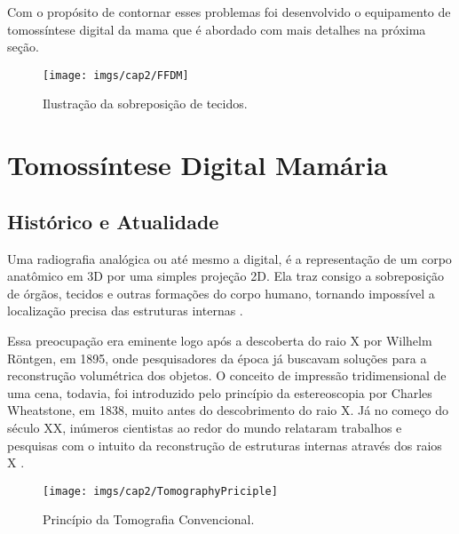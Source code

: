 Com o propósito de contornar esses problemas foi desenvolvido o equipamento de tomossíntese digital da mama que é abordado com mais detalhes na próxima seção. 

\begin{figure}[H]
	\caption{Ilustração da sobreposição de tecidos.}
	\begin{center}
		\texttt{[image: imgs/cap2/FFDM]}
	\end{center}
	\label{fig:imgCap2MamografiaSobreposicao}
\end{figure}    

\section{Tomossíntese Digital Mamária}     

\subsection{Histórico e Atualidade}

Uma radiografia analógica ou até mesmo a digital, é a representação de um corpo anatômico em \acs{3D} por uma simples projeção \acs{2D}. Ela traz consigo a sobreposição de órgãos, tecidos e outras formações do corpo humano, tornando impossível a localização precisa das estruturas internas \cite{levakhina2014three}. 

Essa preocupação era eminente logo após a descoberta do raio X por Wilhelm Röntgen, em 1895, onde pesquisadores da época já buscavam soluções para a reconstrução volumétrica dos objetos. O conceito de impressão tridimensional de uma cena, todavia, foi introduzido pelo princípio da estereoscopia por Charles Wheatstone, em 1838, muito antes do descobrimento do raio X. Já no começo do século XX, inúmeros cientistas ao redor do mundo relataram trabalhos e pesquisas com o intuito da reconstrução de estruturas internas através dos raios X \cite{dobbins2003digital,levakhina2014three}. 

\begin{figure}[H]
	\caption{Princípio da Tomografia Convencional.}
	\begin{center}
		\texttt{[image: imgs/cap2/TomographyPriciple]}
	\end{center}
	\label{fig:imgCap2TomographyPriciple}
\end{figure}

